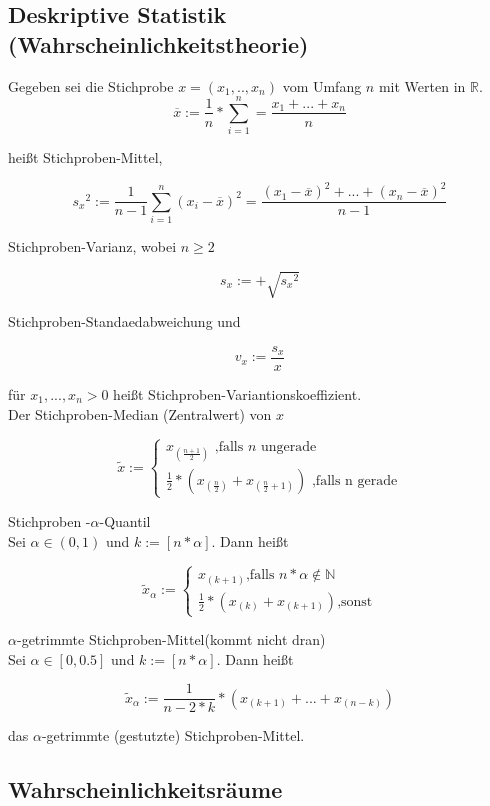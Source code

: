 \subsection{Deskriptive Statistik (Wahrscheinlichkeitstheorie)}

Gegeben sei die Stichprobe $x=(x_1,..,x_n)$ vom Umfang $n$ mit Werten in $\mathbb{R}$.
\[\overline{x}:= \frac{1}{n}*\sum_{i = 1}^{n}=\frac{x_1+...+x_n}{n}     \]

heißt Stichproben-Mittel,

\[{s_x}^2:=\frac{1}{n-1}\sum_{i=1}^{n}(x_i-\overline{x})^2   =\frac{(x_1-\overline{x})^2+...+(x_n-\overline{x})^2}{n-1}\]

Stichproben-Varianz, wobei $n\geq 2$

\[s_x := +\sqrt{{s_x}^2} \]

Stichproben-Standaedabweichung und

\[v_x := \frac{s_x}{x} \]

für $x_1,...,x_n >0 $ heißt Stichproben-Variantionskoeffizient.\\

Der Stichproben-Median (Zentralwert) von $x$

\[\tilde{x} :=\begin{cases}x_{(\frac{n+1}{2})}\textrm{    ,falls $n$ ungerade}\\
    \frac{1}{2}*(x_{(\frac{n}{2})}+x_{(\frac{n}{2}+1)})\textrm{ ,falls n gerade}\end{cases}\]

Stichproben -$\alpha$-Quantil\\

Sei $\alpha \in (0,1)$ und $k:=[n*\alpha]$. Dann heißt

\[\tilde{x}_\alpha  :=\begin{cases}x_{(k+1)}\textrm{,falls $n*\alpha \notin \mathbb{N} $}\\
    \frac{1}{2}*(x_{(k)}+x_{(k+1)})\textrm{,sonst}\end{cases}\]


$\alpha$-getrimmte Stichproben-Mittel(kommt nicht dran)\\

Sei $\alpha \in [0,0.5]$ und $k:=[n*\alpha ]$. Dann heißt

\[\tilde{x}_\alpha := \frac{1}{n-2*k}*(x_{(k+1)}+...+x_{(n-k)}) \]

das $\alpha $-getrimmte (gestutzte) Stichproben-Mittel.


\subsection{Wahrscheinlichkeitsräume}

